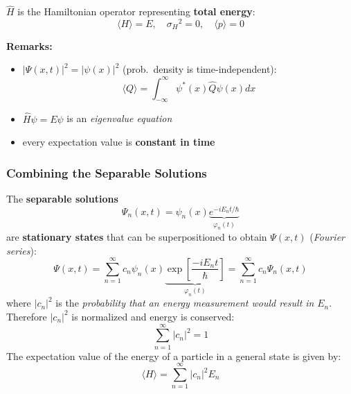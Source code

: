 
$\widehat{H}$ is the Hamiltonian operator representing \textbf{total energy}:
\noindent\begin{equation*}
    \langle H\rangle = E,\quad{\sigma_H}^2 = 0, \quad \langle p\rangle = 0
\end{equation*}

\newpar{}

\textbf{Remarks:}
\begin{itemize}
    \item $|\Psi(x,t)|^2 = |\psi(x)|^2$ (prob.\ density is time-independent):
          \noindent\begin{equation*}
              \langle Q\rangle=\int_{-\infty}^\infty\psi^*(x)\hat{Q}\psi(x)dx
          \end{equation*}
    \item $\widehat{H}\psi = E\psi$ is an \textit{eigenvalue equation}
    \item every expectation value is \textbf{constant in time}
\end{itemize}

\subsubsection{Combining the Separable Solutions}
The \textbf{separable solutions}
\noindent\begin{equation*}
    \Psi_n(x,t)=\psi_n(x)\underbrace{e^{-iE_n t/\hbar}}_{\varphi_n(t)}
\end{equation*}
are \textbf{stationary states} that can be superpositioned to obtain $\Psi(x,t)$ (\textit{Fourier series}):
\noindent\begin{equation*}
    \Psi(x,t) =\sum_{n=1}^\infty c_n\psi_n(x) \underbrace{\exp\left[\frac{-iE_n t}{\hbar}\right]}_{\varphi_n(t)}=\sum_{n=1}^\infty c_n\Psi_n(x,t)
\end{equation*}
where $|c_n|^2$ is the \textit{probability that an energy measurement would result in} $E_n$. Therefore $|c_n|^2$ is normalized and energy is conserved:
\noindent\begin{equation*}
    \sum_{n=1}^\infty|c_n|^2 =1
\end{equation*}
The expectation value of the energy of a particle in a general state is given by:
\noindent\begin{equation*}
    \langle H\rangle=\sum_{n=1}^\infty|c_n|^2E_n
\end{equation*}

